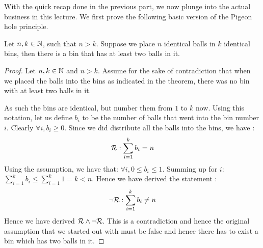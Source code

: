 With the quick recap done in the previous part, we now plunge into the actual business in this lecture. We first prove the following basic version of the Pigeon hole principle.
\begin{theorem}
Let $n,k \in \mathbb{N}$, such that $n > k$. Suppose we place $n$ identical balls in $k$ identical bins, then there is a bin that has  at least  two balls in it.
\end{theorem}
\begin{proof}
Let $n, k \in \mathbb{N}$ and $n > k$. Assume for the sake of contradiction that when we placed the balls into the bins as indicated in the theorem, there was no bin with at least two balls in it. 

As such the bins are identical, but number them from $1$ to $k$ now. Using this notation, let us define $b_i$ to be the number of balls that went into the bin number $i$. Clearly $\forall i, b_i \ge 0$. Since we did distribute all the balls into the bins, we have :
$${\cal R} : \sum_{i=1}^k b_i = n $$
Using the assumption, we have that: $\forall i, 0 \le b_i \le 1$. Summing up for $i$:
$\sum_{i=1}^k b_i \le \sum_{i=1}^k 1 = k < n$. Hence we have derived the statement :
$$\lnot {\cal R} : \sum_{i=1}^k b_i \ne n$$
Hence we have derived ${\cal R} \land \lnot {\cal R}$. This is a contradiction and hence the original assumption that we started out with must be false and hence there has to exist a bin which has two balls in it.
\end{proof}

